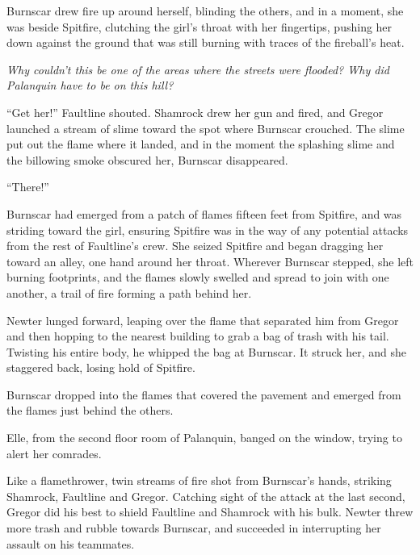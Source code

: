 Burnscar drew fire up around herself, blinding the others, and in a moment, she was beside Spitfire, clutching the girl's throat with her fingertips, pushing her down against the ground that was still burning with traces of the fireball's heat.



\emph{Why couldn't this be one of the areas where the streets were flooded?  Why did Palanquin have to be on this hill?}



``Get her!''  Faultline shouted.  Shamrock drew her gun and fired, and Gregor launched a stream of slime toward the spot where Burnscar crouched.  The slime put out the flame where it landed, and in the moment the splashing slime and the billowing smoke obscured her, Burnscar disappeared.



``There!''



Burnscar had emerged from a patch of flames fifteen feet from Spitfire, and was striding toward the girl, ensuring Spitfire was in the way of any potential attacks from the rest of Faultline's crew.  She seized Spitfire and began dragging her toward an alley, one hand around her throat.  Wherever Burnscar stepped, she left burning footprints, and the flames slowly swelled and spread to join with one another, a trail of fire forming a path behind her.



Newter lunged forward, leaping over the flame that separated him from Gregor and then hopping to the nearest building to grab a bag of trash with his tail.  Twisting his entire body, he whipped the bag at Burnscar.  It struck her, and she staggered back, losing hold of Spitfire.



Burnscar dropped into the flames that covered the pavement and emerged from the flames just behind the others.



Elle, from the second floor room of Palanquin, banged on the window, trying to alert her comrades.



Like a flamethrower, twin streams of fire shot from Burnscar's hands, striking Shamrock, Faultline and Gregor.  Catching sight of the attack at the last second, Gregor did his best to shield Faultline and Shamrock with his bulk.  Newter threw more trash and rubble towards Burnscar, and succeeded in interrupting her assault on his teammates.



